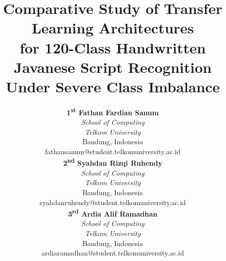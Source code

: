 \documentclass[conference]{IEEEtran}
\begin{document}
\title{Comparative Study of Transfer Learning Architectures\\
for 120-Class Handwritten Javanese Script Recognition\\
Under Severe Class Imbalance}

\author{%
\parbox{\linewidth}{\centering
  \begin{minipage}[t]{.31\linewidth}\centering
    \normalsize\textbf{1\textsuperscript{st} Fathan Fardian Sanum}\\[4pt]
    \normalsize\textit{School of Computing}\\
    \textit{Telkom University}\\
    Bandung, Indonesia\\
    \small fathansanum@student.\linebreak telkomuniversity.ac.id
  \end{minipage}%
  \hfill%
  \begin{minipage}[t]{.31\linewidth}\centering
    \normalsize\textbf{2\textsuperscript{nd} Syahdan Rizqi Ruhendy}\\[4pt]
    \normalsize\textit{School of Computing}\\
    \textit{Telkom University}\\
    Bandung, Indonesia\\
    \small syahdanruhendy@student.\linebreak telkomuniversity.ac.id
  \end{minipage}%
  \hfill%
  \begin{minipage}[t]{.31\linewidth}\centering
    \normalsize\textbf{3\textsuperscript{rd} Ardia Alif Ramadhan}\\[4pt]
    \normalsize\textit{School of Computing}\\
    \textit{Telkom University}\\
    Bandung, Indonesia\\
    \small ardiaramadhan@student.\linebreak telkomuniversity.ac.id
  \end{minipage}%
}%
}

\maketitle
\end{document}
